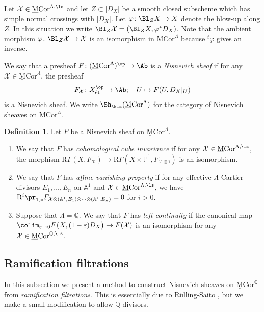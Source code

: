\documentclass{amsart}
\theoremstyle{plain}
\theoremstyle{definition}
\newtheorem{definition}[theorem]{Definition}
\theoremstyle{remark}
\numberwithin{equation}{section}
\def\et{\mathrm{\acute{e}t}}
\def\bcube{{\overline{\square}}}
\def\RGamma{\mathrm{R}\Gamma}
\def\MCor{\mathrm{\underline{M}Cor}}
\begin{document}
Let $\mathcal{X}\in \MCor^{\Lambda,\ls}$ and let $Z\subset |D_X|$ be a smooth closed subscheme which has simple normal crossings with $|D_X|$.
Let $\varphi\colon \Bl_ZX\to X$ denote the blow-up along $Z$.
In this situation we write $\Bl_Z\mathcal{X}=(\Bl_ZX,\varphi^*D_X)$.
Note that the ambient morphism $\varphi\colon \Bl_Z\mathcal{X}\to \mathcal{X}$ is an isomorphism in $\MCor^{\Lambda}$ because ${}^t\varphi$ gives an inverse.



We say that a presheaf $F\colon (\MCor^\Lambda)^\op\to \Ab$ is a \emph{Nisnevich sheaf} if for any $\mathcal{X}\in \MCor^\Lambda$, the presheaf
$$
    F_\mathcal{X}\colon X_\et^\op\to \Ab;\quad U\mapsto F(U,D_X|_U)
$$
is a Nisnevich sheaf.
We write $\Sh_\Nis(\MCor^\Lambda)$ for the category of Nisnevich sheaves on $\MCor^\Lambda$.

\begin{definition}
    Let $F$ be a Nisnevich sheaf on $\MCor^\Lambda$.
    \begin{enumerate}
        \item We say that $F$ has \emph{cohomological cube invariance} if for any $\mathcal{X}\in \MCor^{\Lambda,\ls}$, the morphism $\RGamma(X,F_\mathcal{X})\to \RGamma(X\times\mathbb{P}^1,F_{\mathcal{X}\otimes \bcube})$ is an isomorphism.
        \item We say that $F$ has \emph{affine vanishing property} if for any effective $\Lambda$-Cartier divisors $E_1,\dots,E_n$ on $\mathbb{A}^1$ and $\mathcal{X}\in \MCor^{\Lambda,\ls}$, we have $\mathrm{R}^i\pr_{1,*}F_{\mathcal{X}\otimes(\mathbb{A}^1,E_1)\otimes\cdots\otimes(\mathbb{A}^1,E_n)}=0$ for $i>0$.
        \item Suppose that $\Lambda=\mathbb{Q}$.
        We say that $F$ has \emph{left continuity} if the canonical map
    $\colim_{\varepsilon \to 0} F\bigl(X,(1-\varepsilon)D_X\bigr)\to F(\mathcal{X})$
    is an isomorphism for any $\mathcal{X}\in \MCor^{\mathbb{Q},\ls}$.
    \end{enumerate}
\end{definition}





\subsection{Ramification filtrations}
In this subsection we present a method to construct Nisnevich sheaves on $\MCor^\mathbb{Q}$ from \emph{ramification filtrations}.
This is essentially due to R\"ulling-Saito \cite{RS21}, but we make a small modification to allow $\mathbb{Q}$-divisors.
\end{document}
